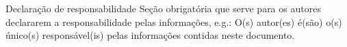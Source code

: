 \documentclass[%
  a4paper,%
  12pt,%
  fleqn,%
  english,%
  brazilian,%
]{article}
\begin{document}
\begin{OverleafFreePlan}
{  \begin{InfoSection}{Declaração de responsabilidade}
  Seção obrigatória que serve para os autores declararem a responsabilidade pelas informações, e.g.:
  O{(s)} autor{(es)} é{(são)} o{(s)} único{(s)} responsável{(is)} pelas informações contidas neste documento.
  \end{InfoSection}
}

\printbibliography%

% 

\end{OverleafFreePlan}

\end{document}
